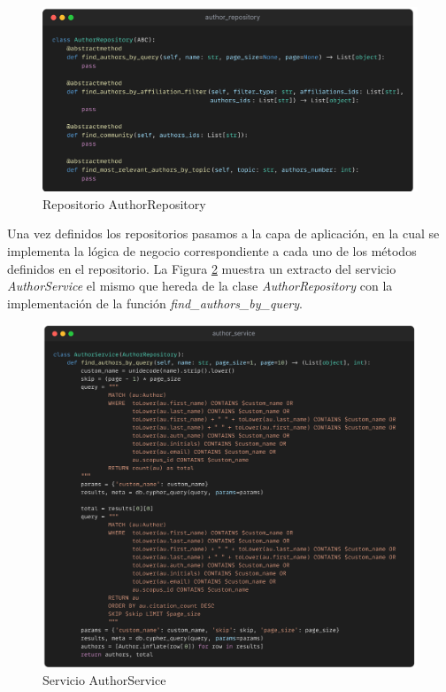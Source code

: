 \begin{figure}[H]
    \centering
    \includegraphics[scale=0.13]{../02Figures/02Chapter/Sprints/Sprint-3/author-repository.png}
    \caption{Repositorio AuthorRepository}
    \label{fig:author-repository}
\end{figure}

Una vez definidos los repositorios pasamos a la capa de aplicación, en la cual se implementa la lógica de negocio correspondiente a cada uno de los métodos definidos en el repositorio.
La Figura \ref{fig:author-service} muestra un extracto del servicio \textit{AuthorService} el mismo que hereda de la clase \textit{AuthorRepository} con la implementación de la función \textit{find\_authors\_by\_query}.

\begin{figure}[H]
    \centering
    \includegraphics[scale=0.11]{../02Figures/02Chapter/Sprints/Sprint-3/author-service.png}
    \caption{Servicio AuthorService}
    \label{fig:author-service}
\end{figure}


